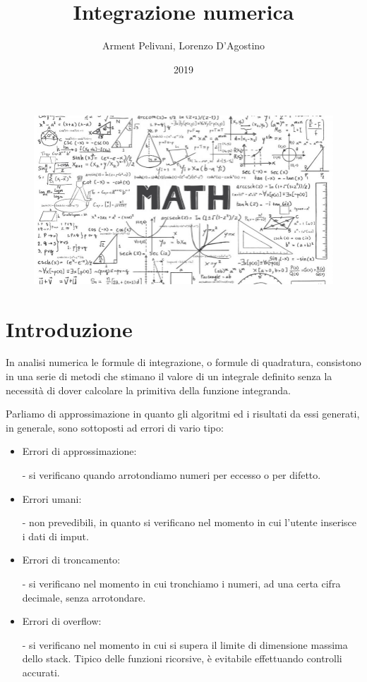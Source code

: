 \documentclass{article}
\title{Integrazione numerica}
\author{Arment Pelivani, Lorenzo D'Agostino}
\date{2019}
\begin{document}
\maketitle
\begin{center}
\begin{figure}[ht]

\includegraphics[scale=0.6]{img/math-emporium.jpg} 
\label{fig:trasl}
\end{figure}

\end{center}

\newpage
\tableofcontents
\newpage
\section{Introduzione}
In analisi numerica le formule di integrazione, o formule di quadratura, consistono in una serie di metodi che stimano il valore di un integrale definito senza la necessità di dover calcolare la primitiva della funzione integranda.

Parliamo di approssimazione in quanto gli algoritmi ed i risultati da essi generati, in generale, sono sottoposti ad errori di vario tipo:

\begin{itemize}
\item Errori di approssimazione: 

- si verificano quando arrotondiamo numeri per eccesso o per difetto.
\item Errori umani: 

- non prevedibili, in quanto si verificano nel momento in cui l'utente inserisce i dati di imput.
\item Errori di troncamento: 

- si verificano nel momento in cui tronchiamo i numeri, ad una certa cifra decimale, senza arrotondare.
\item Errori di overflow: 

- si verificano nel momento in cui si supera il limite di dimensione massima dello stack. Tipico delle funzioni ricorsive, è evitabile effettuando controlli accurati.
\end{itemize}
\end{document}
